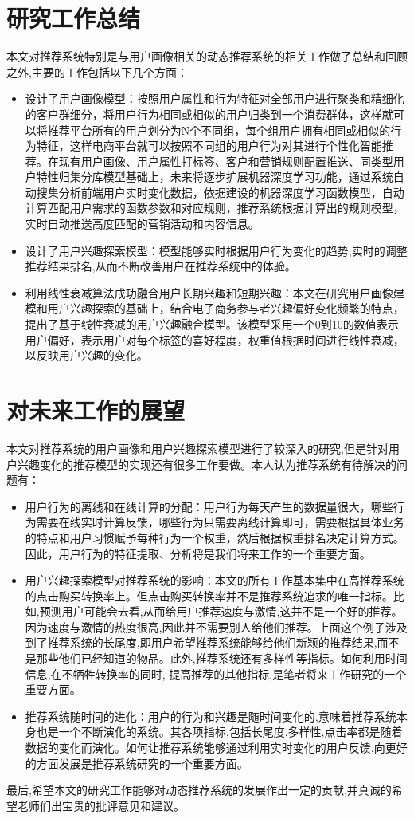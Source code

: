   \section{研究工作总结}
    本文对推荐系统特别是与用户画像相关的动态推荐系统的相关工作做了总结和回顾之外,主要的工作包括以下几个方面：
    \begin{itemize}
      \item 设计了用户画像模型：按照用户属性和行为特征对全部用户进行聚类和精细化的客户群细分，将用户行为相同或相似的用户归类到一个消费群体，这样就可以将推荐平台所有的用户划分为N个不同组，每个组用户拥有相同或相似的行为特征，这样电商平台就可以按照不同组的用户行为对其进行个性化智能推荐。在现有用户画像、用户属性打标签、客户和营销规则配置推送、同类型用户特性归集分库模型基础上，未来将逐步扩展机器深度学习功能，通过系统自动搜集分析前端用户实时变化数据，依据建设的机器深度学习函数模型，自动计算匹配用户需求的函数参数和对应规则，推荐系统根据计算出的规则模型，实时自动推送高度匹配的营销活动和内容信息。
      \item 设计了用户兴趣探索模型：模型能够实时根据用户行为变化的趋势,实时的调整推荐结果排名,从而不断改善用户在推荐系统中的体验。
      \item 利用线性衰减算法成功融合用户长期兴趣和短期兴趣：本文在研究用户画像建模和用户兴趣探索的基础上，结合电子商务参与者兴趣偏好变化频繁的特点，提出了基于线性衰减的用户兴趣融合模型。该模型采用一个0到10的数值表示用户偏好，表示用户对每个标签的喜好程度，权重值根据时间进行线性衰减，以反映用户兴趣的变化。
    \end{itemize}

  \section{对未来工作的展望}
  本文对推荐系统的用户画像和用户兴趣探索模型进行了较深入的研究,但是针对用户兴趣变化的推荐模型的实现还有很多工作要做。本人认为推荐系统有待解决的问题有：
    \begin{itemize}
      \item 用户行为的离线和在线计算的分配：用户行为每天产生的数据量很大，哪些行为需要在线实时计算反馈，哪些行为只需要离线计算即可，需要根据具体业务的特点和用户习惯赋予每种行为一个权重，然后根据权重排名决定计算方式。因此，用户行为的特征提取、分析将是我们将来工作的一个重要方面。
      \item 用户兴趣探索模型对推荐系统的影响：本文的所有工作基本集中在高推荐系统的点击购买转换率上。但点击购买转换率并不是推荐系统追求的唯一指标。比如,预测用户可能会去看,从而给用户推荐速度与激情,这并不是一个好的推荐。因为速度与激情的热度很高,因此并不需要别人给他们推荐。上面这个例子涉及到了推荐系统的长尾度,即用户希望推荐系统能够给他们新颖的推荐结果,而不是那些他们已经知道的物品。此外,推荐系统还有多样性等指标。如何利用时间信息,在不牺牲转换率的同时, 提高推荐的其他指标,是笔者将来工作研究的一个重要方面。
      \item 推荐系统随时间的进化：用户的行为和兴趣是随时间变化的,意味着推荐系统本身也是一个不断演化的系统。其各项指标,包括长尾度,多样性,点击率都是随着数据的变化而演化。如何让推荐系统能够通过利用实时变化的用户反馈,向更好的方面发展是推荐系统研究的一个重要方面。
    \end{itemize}

  最后,希望本文的研究工作能够对动态推荐系统的发展作出一定的贡献,并真诚的希望老师们出宝贵的批评意见和建议。